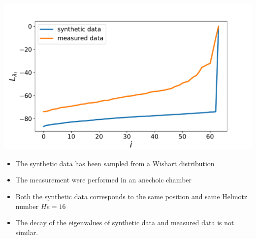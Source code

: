 \documentclass[12pt,pdftex,16x10]{elpres} %
\begin{document}
\begin{psli}
  \begin{minipage}[b][0.7\textheight][t]{0.5\textwidth}
    \centering
    \includegraphics[width=1.2\textwidth]{figs/comparison_synthetic_measurement_data.pdf}
  \end{minipage}
  \begin{minipage}[b][0.7\textheight][t]{0.5\textwidth}
    \begin{itemize}
      \item The synthetic data has been sampled from a Wishart distribution
      \item The measurement were performed in an anechoic chamber
      \item Both the synthetic data corresponds to the same position and same Helmotz number $He = 16$
      \item The decay of the eigenvalues of synthetic data and measured data is not similar.
    \end{itemize}
  \end{minipage}
\end{psli}
\end{document}
